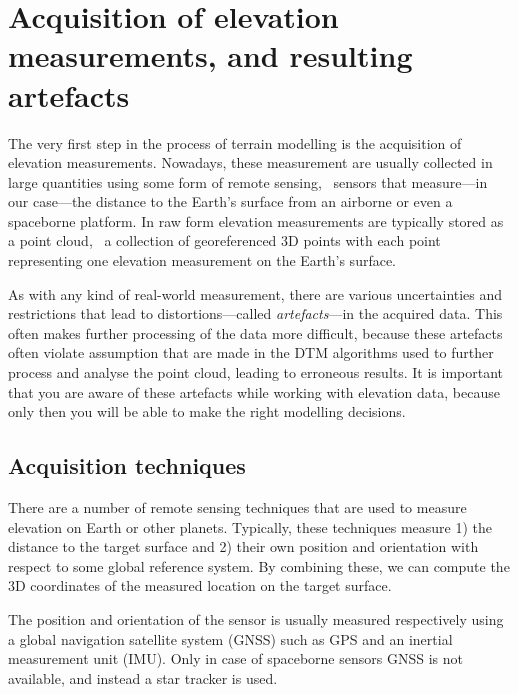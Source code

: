 
\graphicspath{{acquisition/}}

\chapter{Acquisition of elevation measurements, and resulting artefacts}

The very first step in the process of terrain modelling is the acquisition of elevation measurements. 
Nowadays, these measurement are usually collected in large quantities using some form of remote sensing, \ie\ sensors that measure---in our case---the distance to the Earth's surface from an airborne or even a spaceborne platform. 
In raw form elevation measurements are typically stored as a point cloud, \ie\ a collection of georeferenced 3D points with each point representing one elevation measurement on the Earth's surface.

As with any kind of real-world measurement, there are various uncertainties and restrictions that lead to distortions---called \emph{artefacts}---in the acquired data. 
This often makes further processing of the data more difficult, because these artefacts often violate assumption that are made in the DTM algorithms used to further process and analyse the point cloud, leading to erroneous results. 
It is important that you are aware of these artefacts while working with elevation data, because only then you will be able to make the right modelling decisions. 


\section{Acquisition techniques}
\label{sec:techniques}
There are a number of remote sensing techniques that are used to measure elevation on Earth or other planets. 
Typically, these techniques measure 1) the distance to the target surface and 2) their own position and orientation with respect to some global reference system. 
By combining these, we can compute the 3D coordinates of the measured location on the target surface. 

The position and orientation of the sensor is usually measured respectively using a global navigation satellite system (GNSS) such as GPS and an inertial measurement unit (IMU).
Only in case of spaceborne sensors GNSS is not available, and instead a star tracker is used.

